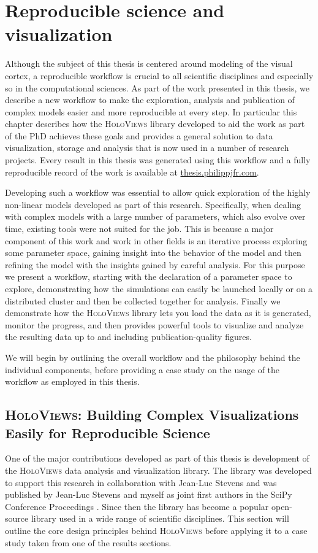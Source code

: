 \chapter{Reproducible science and visualization}

Although the subject of this thesis is centered around modeling of the
visual cortex, a reproducible workflow is crucial to all scientific
disciplines and especially so in the computational sciences. As part
of the work presented in this thesis, we describe a new workflow to
make the exploration, analysis and publication of complex models
easier and more reproducible at every step. In particular this chapter
describes how the \textsc{HoloViews} library developed to aid the work
as part of the PhD achieves these goals and provides a general
solution to data visualization, storage and analysis that is now used
in a number of research projects. Every result in this thesis was
generated using this workflow and a fully reproducible record of the
work is available at \url{thesis.philippjfr.com}.

Developing such a workflow was essential to allow quick exploration of
the highly non-linear models developed as part of this
research. Specifically, when dealing with complex models with a large
number of parameters, which also evolve over time, existing tools were
not suited for the job. This is because a major component of this work
and work in other fields is an iterative process exploring some
parameter space, gaining insight into the behavior of the model and
then refining the model with the insights gained by careful
analysis. For this purpose we present a workflow, starting with the
declaration of a parameter space to explore, demonstrating how the
simulations can easily be launched locally or on a distributed cluster
and then be collected together for analysis. Finally we demonstrate
how the \textsc{HoloViews} library lets you load the data as it is
generated, monitor the progress, and then provides powerful tools to
visualize and analyze the resulting data up to and including
publication-quality figures.

We will begin by outlining the overall workflow and the philosophy
behind the individual components, before providing a case study on
the usage of the workflow as employed in this thesis.

\section{\textsc{HoloViews}: Building Complex Visualizations Easily for Reproducible Science}
One of the major contributions developed as part of this thesis is
development of the \textsc{HoloViews} data analysis and visualization
library.  The library was developed to support this research in
collaboration with Jean-Luc Stevens and was published by Jean-Luc
Stevens and myself as joint first authors in the SciPy Conference
Proceedings \citep{Stevens2015}. Since then the library has become a
popular open-source library used in a wide range of scientific
disciplines. This section will outline the core design principles
behind \textsc{HoloViews} before applying it to a case study taken
from one of the results sections.

